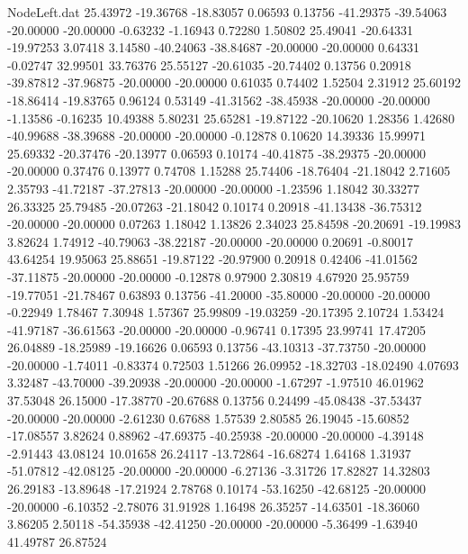 \begin{filecontents}{NodeLeft.dat}
  25.43972  -19.36768  -18.83057     0.06593    0.13756  -41.29375  -39.54063  -20.00000  -20.00000   -0.63232   -1.16943    0.72280    1.50802
  25.49041  -20.64331  -19.97253     3.07418    3.14580  -40.24063  -38.84687  -20.00000  -20.00000    0.64331   -0.02747   32.99501   33.76376
  25.55127  -20.61035  -20.74402     0.13756    0.20918  -39.87812  -37.96875  -20.00000  -20.00000    0.61035    0.74402    1.52504    2.31912
  25.60192  -18.86414  -19.83765     0.96124    0.53149  -41.31562  -38.45938  -20.00000  -20.00000   -1.13586   -0.16235   10.49388    5.80231
  25.65281  -19.87122  -20.10620     1.28356    1.42680  -40.99688  -38.39688  -20.00000  -20.00000   -0.12878    0.10620   14.39336   15.99971
  25.69332  -20.37476  -20.13977     0.06593    0.10174  -40.41875  -38.29375  -20.00000  -20.00000    0.37476    0.13977    0.74708    1.15288
  25.74406  -18.76404  -21.18042     2.71605    2.35793  -41.72187  -37.27813  -20.00000  -20.00000   -1.23596    1.18042   30.33277   26.33325
  25.79485  -20.07263  -21.18042     0.10174    0.20918  -41.13438  -36.75312  -20.00000  -20.00000    0.07263    1.18042    1.13826    2.34023
  25.84598  -20.20691  -19.19983     3.82624    1.74912  -40.79063  -38.22187  -20.00000  -20.00000    0.20691   -0.80017   43.64254   19.95063
  25.88651  -19.87122  -20.97900     0.20918    0.42406  -41.01562  -37.11875  -20.00000  -20.00000   -0.12878    0.97900    2.30819    4.67920
  25.95759  -19.77051  -21.78467     0.63893    0.13756  -41.20000  -35.80000  -20.00000  -20.00000   -0.22949    1.78467    7.30948    1.57367
  25.99809  -19.03259  -20.17395     2.10724    1.53424  -41.97187  -36.61563  -20.00000  -20.00000   -0.96741    0.17395   23.99741   17.47205
  26.04889  -18.25989  -19.16626     0.06593    0.13756  -43.10313  -37.73750  -20.00000  -20.00000   -1.74011   -0.83374    0.72503    1.51266
  26.09952  -18.32703  -18.02490     4.07693    3.32487  -43.70000  -39.20938  -20.00000  -20.00000   -1.67297   -1.97510   46.01962   37.53048
  26.15000  -17.38770  -20.67688     0.13756    0.24499  -45.08438  -37.53437  -20.00000  -20.00000   -2.61230    0.67688    1.57539    2.80585
  26.19045  -15.60852  -17.08557     3.82624    0.88962  -47.69375  -40.25938  -20.00000  -20.00000   -4.39148   -2.91443   43.08124   10.01658
  26.24117  -13.72864  -16.68274     1.64168    1.31937  -51.07812  -42.08125  -20.00000  -20.00000   -6.27136   -3.31726   17.82827   14.32803
  26.29183  -13.89648  -17.21924     2.78768    0.10174  -53.16250  -42.68125  -20.00000  -20.00000   -6.10352   -2.78076   31.91928    1.16498
  26.35257  -14.63501  -18.36060     3.86205    2.50118  -54.35938  -42.41250  -20.00000  -20.00000   -5.36499   -1.63940   41.49787   26.87524

\end{filecontents}
